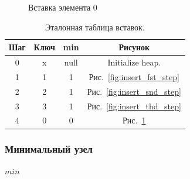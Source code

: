 \documentclass[a4paper,10pt]{article}
\begin{document}
        \begin{figure}[h!]
            \caption{Вставка элемента 0}
            \label{fig:insert_fth_step}
            \center
        \end{figure}
        \begin{table}[h!]
            \begin{tabular}{|c|c|c|c|}
                \hline
                Шаг & Ключ & min   & Рисунок                        \\ \hline
                0    & x   &  null & Initialize heap.               \\ \hline
                1    & 1   &  1    & Рис.~\ref{fig:insert_fst_step} \\ \hline
                2    & 2   &  1    & Рис.~\ref{fig:insert_snd_step} \\ \hline
                3    & 3   &  1    & Рис.~\ref{fig:insert_thd_step} \\ \hline
                4    & 0   &  0    & Рис.~\ref{fig:insert_fth_step} \\ \hline
            \end{tabular}
            \caption{Эталонная таблица вставок.}
			\center
        \end{table}

        \subsubsection*{Минимальный узел}
            \begin{algorithmic}[1]
                    \State \Return $min$
                \EndFunction
            \end{algorithmic}
\end{document}
